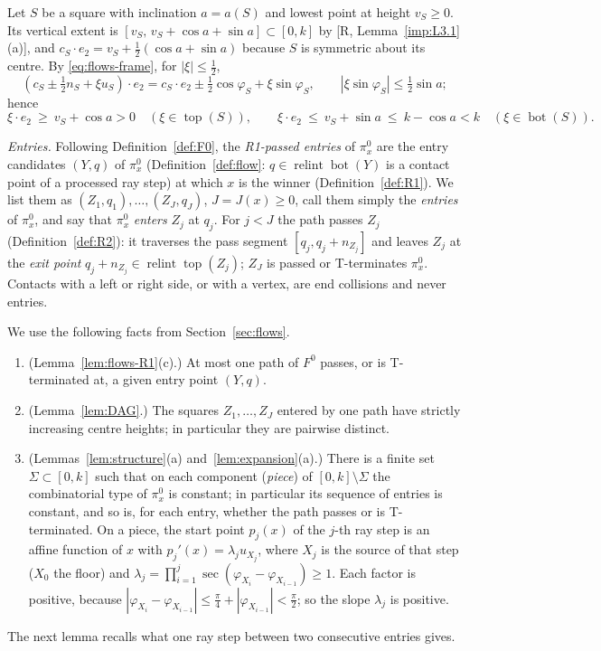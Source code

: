 \documentclass[11pt]{amsart}
\newcommand{\relint}{\operatorname{relint}}
\newcommand{\Bot}{\operatorname{bot}}
\newcommand{\Top}{\operatorname{top}}
\newcommand{\Fz}{F^{0}}
\theoremstyle{definition}
\theoremstyle{remark}
\numberwithin{equation}{section}
\begin{document}
Let $S$ be a square with inclination $a=a(S)$ and lowest point at height $v_S\ge0$. Its vertical extent is
$[v_S,\,v_S+\cos a+\sin a]\subset[0,k]$ by [R, Lemma~\ref{imp:L3.1}(a)], and
$c_S\cdot e_2=v_S+\frac12(\cos a+\sin a)$ because $S$ is symmetric about its centre. By \eqref{eq:flows-frame}, for
$|\xi|\le\frac12$,
\[
(c_S\pm\tfrac12n_S+\xi u_S)\cdot e_2=c_S\cdot e_2\pm\tfrac12\cos\varphi_S+\xi\sin\varphi_S,\qquad
|\xi\sin\varphi_S|\le\tfrac12\sin a ;
\]
hence
\begin{equation}\label{eq:P6-heights}
\xi\cdot e_2\ \ge\ v_S+\cos a>0\quad(\xi\in\Top(S)),\qquad
\xi\cdot e_2\ \le\ v_S+\sin a\ \le\ k-\cos a<k\quad(\xi\in\Bot(S)).
\end{equation}

\emph{Entries.} Following Definition~\ref{def:F0}, the \emph{R1-passed entries} of $\pi^0_x$ are the entry candidates
$(Y,q)$ of $\pi^0_x$ (Definition~\ref{def:flow}: $q\in\relint\Bot(Y)$ is a contact point of a processed ray step)
at which $x$ is the winner (Definition~\ref{def:R1}). We list them as $(Z_1,q_1),\dots,(Z_J,q_J)$, $J=J(x)\ge0$, call
them simply the \emph{entries} of $\pi^0_x$, and say that $\pi^0_x$ \emph{enters} $Z_j$ at $q_j$. For $j<J$ the path
passes $Z_j$ (Definition~\ref{def:R2}): it traverses the pass segment $[q_j,q_j+n_{Z_j}]$ and leaves $Z_j$ at the
\emph{exit point} $q_j+n_{Z_j}\in\relint\Top(Z_j)$; $Z_J$ is passed or T-terminates $\pi^0_x$. Contacts with a left
or right side, or with a vertex, are end collisions and never entries.

We use the following facts from Section~\ref{sec:flows}.
\begin{enumerate}[label=(F\arabic*)]
\item\label{it:P6-F1} (Lemma~\ref{lem:flows-R1}(c).) At most one path of $\Fz$ passes, or is T-terminated at, a
given entry point $(Y,q)$.
\item\label{it:P6-F2} (Lemma~\ref{lem:DAG}.) The squares $Z_1,\dots,Z_J$ entered by one path have strictly increasing
centre heights; in particular they are pairwise distinct.
\item\label{it:P6-F3} (Lemmas~\ref{lem:structure}(a) and~\ref{lem:expansion}(a).) There is a finite set
$\Sigma\subset[0,k]$ such that on each component (\emph{piece}) of $[0,k]\setminus\Sigma$ the combinatorial type of
$\pi^0_x$ is constant; in particular its sequence of entries is constant, and so is, for each entry, whether the
path passes or is T-terminated. On a piece, the start point $p_j(x)$ of the $j$-th ray step is an affine function of
$x$ with $p_j'(x)=\lambda_ju_{X_j}$, where $X_j$ is the source of that step ($X_0$ the floor) and
$\lambda_j=\prod_{i=1}^j\sec(\varphi_{X_i}-\varphi_{X_{i-1}})\ge1$. Each factor is positive, because
$|\varphi_{X_i}-\varphi_{X_{i-1}}|\le\frac\pi4+|\varphi_{X_{i-1}}|<\frac\pi2$; so the slope $\lambda_j$ is positive.
\end{enumerate}
The next lemma recalls what one ray step between two consecutive entries gives.
\end{document}
